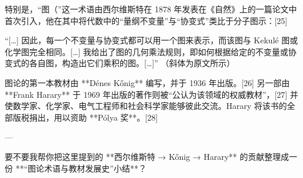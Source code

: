 特别是，“图（”这一术语由西尔维斯特在 1878 年发表在《自然》上的一篇论文中首次引入，他在其中将代数中的“量纲不变量”与“协变式”类比于分子图示：[25]

“[…] 因此，每一个不变量与协变式都可以用一个图来表示，而该图与 Kekulé 图或化学图完全相同。[…] 我给出了图的几何乘法规则，即如何根据给定的不变量或协变式的各自图，构造出它们乘积的图。[…]”
（斜体为原文所示）

图论的第一本教材由 **Dénes Kőnig** 编写，并于 1936 年出版。[26] 另一部由 **Frank Harary** 于 1969 年出版的著作则被“公认为该领域的权威教材”，[27] 并使数学家、化学家、电气工程师和社会科学家能够彼此交流。Harary 将该书的全部版税捐出，用以资助 **Pólya 奖**。[28]

---

要不要我帮你把这里提到的 **西尔维斯特 → Kőnig → Harary** 的贡献整理成一份 **“图论术语与教材发展史”小结**？
